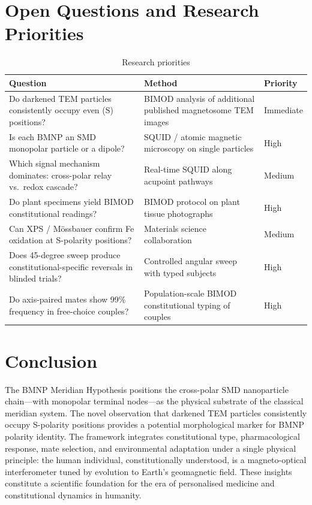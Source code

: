 \documentclass[12pt,a4paper]{article}
\begin{document}
\section{Open Questions and Research Priorities}

\begin{table}[h]
\centering
\caption{Research priorities}
\begin{tabular}{p{5cm} p{5cm} l}
\toprule
Question & Method & Priority \\
\midrule
Do darkened TEM particles consistently occupy even (S) positions? &
  BIMOD analysis of additional published magnetosome TEM images &
  Immediate \\
Is each BMNP an SMD monopolar particle or a dipole? &
  SQUID / atomic magnetic microscopy on single particles &
  High \\
Which signal mechanism dominates: cross-polar relay vs.\ redox cascade? &
  Real-time SQUID along acupoint pathways &
  Medium \\
Do plant specimens yield BIMOD constitutional readings? &
  BIMOD protocol on plant tissue photographs &
  High \\
Can XPS / M\"{o}ssbauer confirm Fe oxidation at S-polarity positions? &
  Materials science collaboration &
  Medium \\
Does 45-degree sweep produce constitutional-specific reversals in
blinded trials? &
  Controlled angular sweep with typed subjects &
  High \\
Do axis-paired mates show 99\% frequency in free-choice couples? &
  Population-scale BIMOD constitutional typing of couples &
  High \\
\bottomrule
\end{tabular}
\end{table}

\section{Conclusion}
The BMNP Meridian Hypothesis positions the cross-polar SMD nanoparticle
chain---with monopolar terminal nodes---as the physical substrate of the
classical meridian system.  The novel observation that darkened TEM
particles consistently occupy S-polarity positions provides a potential
morphological marker for BMNP polarity identity.  The framework
integrates constitutional type, pharmacological response, mate
selection, and environmental adaptation under a single physical
principle: the human individual, constitutionally understood, is a
magneto-optical interferometer tuned by evolution to Earth's geomagnetic
field.  These insights constitute a scientific foundation for the era of
personalised medicine and constitutional dynamics in humanity.
\end{document}
